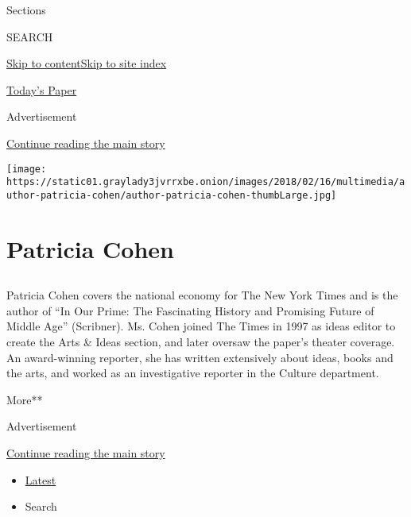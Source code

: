 Sections

SEARCH

\protect\hyperlink{site-content}{Skip to
content}\protect\hyperlink{site-index}{Skip to site index}

\href{https://myaccount.nytimes3xbfgragh.onion/auth/login?response_type=cookie\&client_id=vi}{}

\href{https://www.nytimes3xbfgragh.onion/section/todayspaper}{Today's
Paper}

Advertisement

\protect\hyperlink{after-top}{Continue reading the main story}

\texttt{[image: https://static01.graylady3jvrrxbe.onion/images/2018/02/16/multimedia/author-patricia-cohen/author-patricia-cohen-thumbLarge.jpg]}

\hypertarget{patricia-cohen}{%
\section{Patricia Cohen}\label{patricia-cohen}}

\subsection{}

Patricia Cohen covers the national economy for The New York Times and is
the author of ``In Our Prime: The Fascinating History and Promising
Future of Middle Age'' (Scribner). Ms. Cohen joined The Times in 1997 as
ideas editor to create the Arts \& Ideas section, and later oversaw the
paper's theater coverage. An award-winning reporter, she has written
extensively about ideas, books and the arts, and worked as an
investigative reporter in the Culture department.

More**

Advertisement

\protect\hyperlink{after-mid1}{Continue reading the main story}

\begin{itemize}
\tightlist
\item
  \protect\hyperlink{stream-panel}{Latest}
\item
  Search
\end{itemize}

